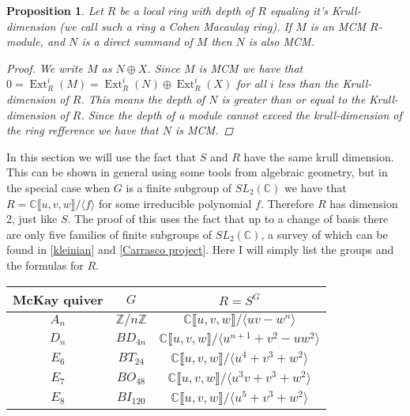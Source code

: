\documentclass[11pt, a4paper, english]{article}
\newtheorem{prop}{Proposition}
\numberwithin{prop}{section}
\numberwithin{lemma}{section}
\numberwithin{theorem}{section}
\numberwithin{defin}{section}
\numberwithin{example}{section}
\newcommand{\C}{\mathbb{C}}
\DeclareMathOperator{\Ext}{Ext}
\begin{document}
\begin{prop}
Let $R$ be a local ring with depth of $R$ equaling it's Krull-dimension (we call such a ring a Cohen Macaulay ring). If $M$ is an MCM $R$-module, and $N$ is a direct summand of $M$ then $N$ is also MCM.
\begin{proof}
We write $M$ as $N \oplus X$. Since $M$ is MCM we have that $0 = \Ext^i_R(M) = \Ext^i_R(N) \oplus \Ext^i_R(X)$ for all $i$ less than the Krull-dimension of $R$. This means the depth of $N$ is greater than or equal to the Krull-dimension of $R$. Since the depth of a module cannot exceed the krull-dimension of the ring {\color{red} refference} we have that $N$ is MCM.
\end{proof}
\end{prop}

In this section we will use the fact that $S$ and $R$ have the same krull dimension. This can be shown in general using some tools from algebraic geometry, but in the special case when $G$ is a finite subgroup of $SL_2(\C)$ we have that $R = \C \llbracket u, v, w \rrbracket / \langle f \rangle$ for some irreducible polynomial $f$. Therefore $R$ has dimension 2, just like $S$. The proof of this uses the fact that up to a change of basis there are only five families of finite subgroups of $SL_2(\C)$, a survey of which can be found in [\href{https://staff.fnwi.uva.nl/r.r.j.bocklandt/notes/kleinian.pdf}{kleinian}] and [\href{https://homepages.warwick.ac.uk/~masda/McKay/Carrasco_Project.pdf}{Carrasco project}]. Here I will simply list the groups and the formulas for $R$.

\begin{center}
{\renewcommand{\arraystretch}{1.6}
\begin{tabular}{|c|c|c|}
\hline
McKay quiver & $G$ & $R = S^G$\\
\hline\hline
$A_n$ & $\mathbb{Z}/n\mathbb{Z}$ & 
$\C \llbracket u, v, w \rrbracket/\langle uv - w^n \rangle$
\\
\hline
$D_n$ & $BD_{4n}$ & 
$\C \llbracket u, v, w \rrbracket/\langle u^{n+1} + v^2 - uw^2\rangle$
\\
\hline
$E_6$ & $BT_24$ & 
$\C \llbracket u, v, w \rrbracket/\langle u^4 + v^3 + w^2 \rangle$
\\
\hline
$E_7$ & $BO_{48}$ &
$\C \llbracket u, v, w \rrbracket/\langle u^3v + v^3 + w^2 \rangle$
\\
\hline
$E_8$ & $BI_{120}$ &
$\C \llbracket u, v, w \rrbracket/\langle u^5 + v^3 + w^2 \rangle$
\\
\hline
\end{tabular}
}
\end{center}
\end{document}
